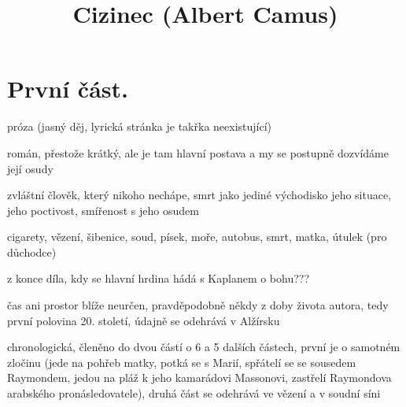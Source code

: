 \documentclass{article}
\title{\vspace{-2cm}Cizinec (Albert Camus)\vspace{-2cm}}
\date{}
\author{}
\begin{document}
\maketitle
\section{První část.}
\begin{description}
    \setlength\itemsep{0.15em}
    \item[druh:] próza (jasný děj, lyrická stránka je takřka neexistující)
    \item[žánr:] román, přestože krátký, ale je tam hlavní postava a my se postupně dozvídáme její osudy
    \item[téma:] zvláštní člověk, který nikoho nechápe, smrt jako jediné východisko jeho situace, jeho poctivost,
        smířenost s jeho osudem
    \item[motivy:] cigarety, vězení, šibenice, soud, písek, moře, autobus, smrt, matka, útulek (pro důchodce)
    \item[zařazení výňatku do kontextu díla:] z konce díla, kdy se hlavní hrdina hádá s Kaplanem o bohu???
    \item[časoprostor:] čas ani prostor blíže neurčen, pravděpodobně někdy z doby života autora, tedy první polovina
        20. století, údajně se odehrává v Alžírsku
    \item[kompoziční výstavba:] chronologická, členěno do dvou částí o 6 a 5 dalších částech, první je o samotném zločinu
        (jede na pohřeb matky, potká se s Marií, spřátelí se se sousedem Raymondem, jedou na pláž k jeho kamarádovi
        Massonovi, zastřelí Raymondova arabského pronásledovatele), druhá část se odehrává ve vězení a v soudní
        síni
\end{description}
\end{document}
